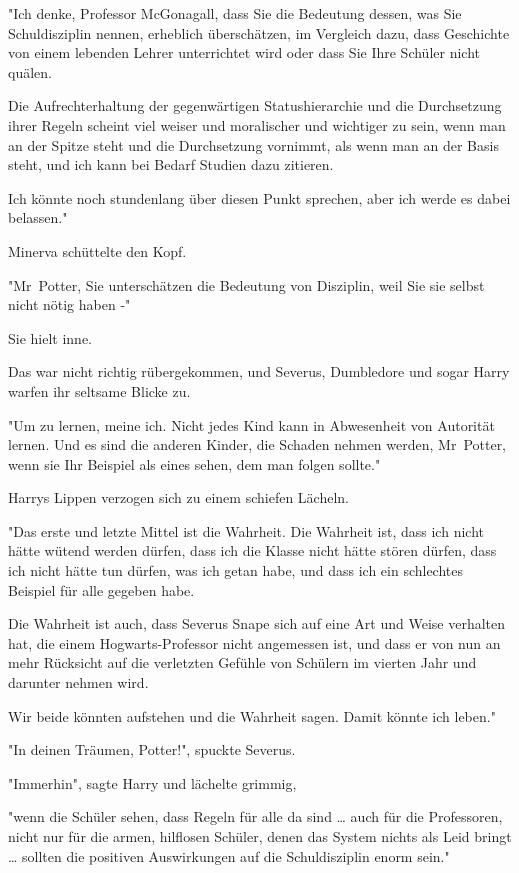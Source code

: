 {"Ich denke, Professor McGonagall, dass Sie die Bedeutung dessen, was Sie Schuldisziplin nennen, erheblich überschätzen, im Vergleich dazu, dass Geschichte von einem lebenden Lehrer unterrichtet wird oder dass Sie Ihre Schüler nicht quälen.

Die Aufrechterhaltung der gegenwärtigen Statushierarchie und die Durchsetzung ihrer Regeln scheint viel weiser und moralischer und wichtiger zu sein, wenn man an der Spitze steht und die Durchsetzung vornimmt, als wenn man an der Basis steht, und ich kann bei Bedarf Studien dazu zitieren.

Ich könnte noch stundenlang über diesen Punkt sprechen, aber ich werde es dabei belassen."

Minerva schüttelte den Kopf.

"Mr~Potter, Sie unterschätzen die Bedeutung von Disziplin, weil Sie sie selbst nicht nötig haben -"

Sie hielt inne.

Das war nicht richtig rübergekommen, und Severus, Dumbledore und sogar Harry warfen ihr seltsame Blicke zu.

"Um zu lernen, meine ich. Nicht jedes Kind kann in Abwesenheit von Autorität lernen. Und es sind die anderen Kinder, die Schaden nehmen werden, Mr~Potter, wenn sie Ihr Beispiel als eines sehen, dem man folgen sollte."

Harrys Lippen verzogen sich zu einem schiefen Lächeln.

"Das erste und letzte Mittel ist die Wahrheit. Die Wahrheit ist, dass ich nicht hätte wütend werden dürfen, dass ich die Klasse nicht hätte stören dürfen, dass ich nicht hätte tun dürfen, was ich getan habe, und dass ich ein schlechtes Beispiel für alle gegeben habe.

Die Wahrheit ist auch, dass Severus Snape sich auf eine Art und Weise verhalten hat, die einem Hogwarts-Professor nicht angemessen ist, und dass er von nun an mehr Rücksicht auf die verletzten Gefühle von Schülern im vierten Jahr und darunter nehmen wird.

Wir beide könnten aufstehen und die Wahrheit sagen. Damit könnte ich leben."

"In deinen Träumen, Potter!", spuckte Severus.

"Immerhin", sagte Harry und lächelte grimmig,

"wenn die Schüler sehen, dass Regeln für alle da sind … auch für die Professoren, nicht nur für die armen, hilflosen Schüler, denen das System nichts als Leid bringt … sollten die positiven Auswirkungen auf die Schuldisziplin enorm sein."

}
